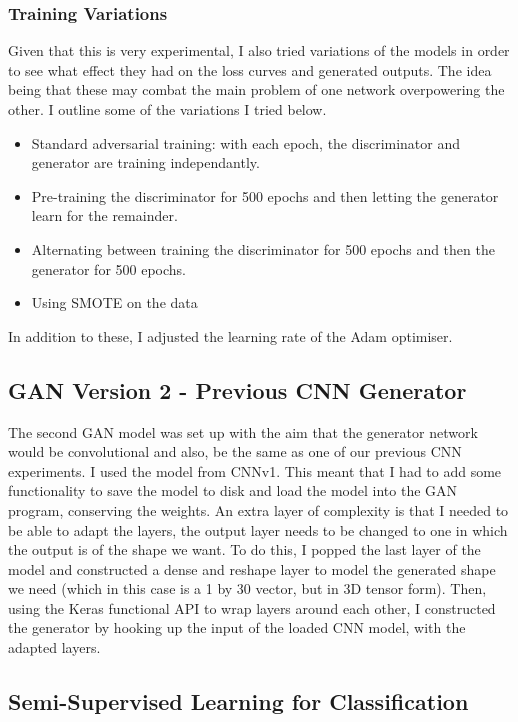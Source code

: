\documentclass[12pt,a4paper,twoside]{report}
\begin{document}
\subsubsection{Training Variations}

Given that this is very experimental, I also tried variations of the models in order to see what effect they had on the loss curves and generated outputs. The idea being that these may combat the main problem of one network overpowering the other. I outline some of the variations I tried below.

\begin{itemize}
\item Standard adversarial training: with each epoch, the discriminator and generator are training independantly. 
\item Pre-training the discriminator for 500 epochs and then letting the generator learn for the remainder.
\item Alternating between training the discriminator for 500 epochs and then the generator for 500 epochs.
\item Using SMOTE on the data
\end{itemize}

In addition to these, I adjusted the learning rate of the Adam optimiser. 

\subsection{GAN Version 2 - Previous CNN Generator}

The second GAN model was set up with the aim that the generator network would be convolutional and also, be the same as one of our previous CNN experiments. I used the model from CNNv1. This meant that I had to add some functionality to save the model to disk and load the model into the GAN program, conserving the weights. An extra layer of complexity is that I needed to be able to adapt the layers, the output layer needs to be changed to one in which the output is of the shape we want. To do this, I popped the last layer of the model and constructed a dense and reshape layer to model the generated shape we need (which in this case is a 1 by 30 vector, but in 3D tensor form). Then, using the Keras functional API to wrap layers around each other, I constructed the generator by hooking up the input of the loaded CNN model, with the adapted layers. 



\subsection{Semi-Supervised Learning for Classification}
\end{document}
